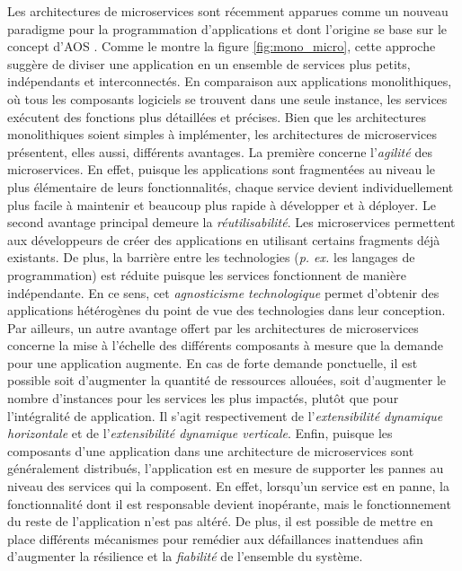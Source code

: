 Les architectures de microservices sont récemment apparues comme un nouveau paradigme pour la programmation d'applications \citep{Dragoni2017} et dont l'origine se base sur le concept d'\ac{AOS} \citep{MacKenzie2006}. Comme le montre la figure \ref{fig:mono_micro}, cette approche suggère de diviser une application en un ensemble de services plus petits, indépendants et interconnectés. En comparaison aux applications monolithiques, où tous les composants logiciels se trouvent dans une seule instance, les services exécutent des fonctions plus détaillées et précises. Bien que les architectures monolithiques soient simples à implémenter, les architectures de microservices présentent, elles aussi, différents avantages. La première concerne l'\emph{agilité} des microservices. En effet, puisque les applications sont fragmentées au niveau le plus élémentaire de leurs fonctionnalités, chaque service devient individuellement plus facile à maintenir et beaucoup plus rapide à développer et à déployer. Le second avantage principal demeure la \emph{réutilisabilité}. Les microservices permettent aux développeurs de créer des applications en utilisant certains fragments déjà existants. De plus, la barrière entre les technologies (\textit{p. ex.} les langages de programmation) est réduite puisque les services fonctionnent de manière indépendante. En ce sens, cet \emph{agnosticisme technologique} permet d'obtenir des applications hétérogènes du point de vue des technologies dans leur conception. Par ailleurs, un autre avantage offert par les architectures de microservices concerne la mise à l'échelle des différents composants à mesure que la demande pour une application augmente. En cas de forte demande ponctuelle, il est possible soit d'augmenter la quantité de ressources allouées, soit d'augmenter le nombre d'instances pour les services les plus impactés, plutôt que pour l'intégralité de application. Il s'agit respectivement de l'\emph{extensibilité dynamique horizontale} et de l'\emph{extensibilité dynamique verticale}. Enfin, puisque les composants d'une application dans une architecture de microservices sont généralement distribués, l'application est en mesure de supporter les pannes au niveau des services qui la composent. En effet, lorsqu'un service est en panne, la fonctionnalité dont il est responsable devient inopérante, mais le fonctionnement du reste de l'application n'est pas altéré. De plus, il est possible de mettre en place différents mécanismes pour remédier aux défaillances inattendues afin d'augmenter la résilience et la \emph{fiabilité} de l'ensemble du système.

